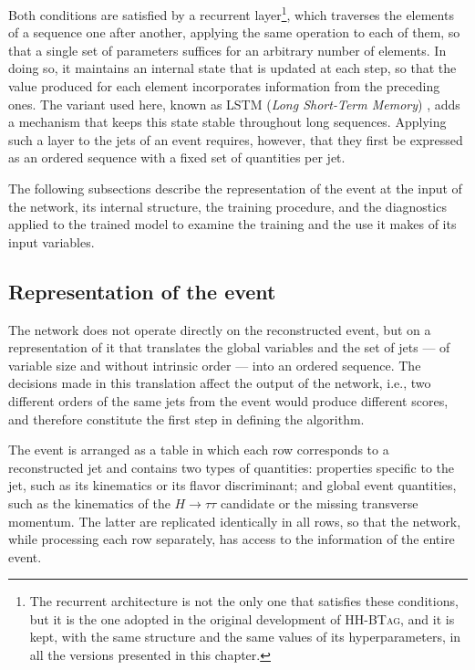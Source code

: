 Both conditions are satisfied by a recurrent layer\footnote{The recurrent architecture is not the only one that satisfies these conditions, but it is the one adopted in the original development of \textsc{HH-BTag}, and it is kept, with the same structure and the same values of its hyperparameters, in all the versions presented in this chapter.}, which traverses the elements of a sequence one after another, applying the same operation to each of them, so that a single set of parameters suffices for an arbitrary number of elements. In doing so, it maintains an internal state that is updated at each step, so that the value produced for each element incorporates information from the preceding ones. The variant used here, known as LSTM (\textit{Long Short-Term Memory}) \cite{Hochreiter1997}, adds a mechanism that keeps this state stable throughout long sequences. Applying such a layer to the jets of an event requires, however, that they first be expressed as an ordered sequence with a fixed set of quantities per jet.\medskip


The following subsections describe the representation of the event at the input of the network, its internal structure, the training procedure, and the diagnostics applied to the trained model to examine the training and the use it makes of its input variables.


\subsection{Representation of the event}
\label{subsec:inputs}
%
The network does not operate directly on the reconstructed event, but on a representation of it that translates the global variables and the set of jets — of variable size and without intrinsic order — into an ordered sequence. The decisions made in this translation affect the output of the network, i.e., two different orders of the same jets from the event would produce different scores, and therefore constitute the first step in defining the algorithm. 

The event is arranged as a table in which each row corresponds to a reconstructed jet and contains two types of quantities: properties specific to the jet, such as its kinematics or its flavor discriminant; and global event quantities, such as the kinematics of the $H\rightarrow\tau\tau$ candidate or the missing transverse momentum. The latter are replicated identically in all rows, so that the network, while processing each row separately, has access to the information of the entire event.


